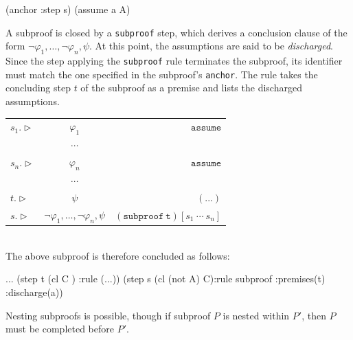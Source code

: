 \begin{code}[style=lbnf,escapechar=@]
	(anchor :step s)
	(assume a A)
\end{code}


A subproof is closed by a \texttt{subproof} step, which derives a conclusion clause of the form $\lnot\varphi_1,\ldots,\lnot\varphi_n,\psi$. At this point, the assumptions are said to be \emph{discharged}. Since the step applying the \texttt{subproof} rule terminates the subproof, its identifier must match the one specified in the subproof's \texttt{anchor}. The rule takes the concluding step $t$ of the subproof as a premise and lists the discharged assumptions.

\noindent\begin{tabularx}{\linewidth}{ l C r }
	$s_1.\triangleright$ &
	$\varphi_1$ &
	${\mathtt{assume}}$ \\
	
	& $\cdots$ & \\
	
	$s_n.\triangleright$ &
	$\varphi_n$ &
	${\mathtt{assume}}$ \\
	
	& $\cdots$ & \\
	
	$t.\triangleright$ &
	$\psi$ &
	${\mathtt{(...)}}$ \\


	$s.\triangleright$ & 
	$\lnot\varphi_1,\dots,\lnot\varphi_n,\psi$ & 
	${\mathtt{(subproof \: t)}[s_1 \: \cdots \: s_n]}$
\end{tabularx} \\

The above subproof is therefore concluded as follows:

\begin{code}[style=lbnf,escapechar=@]
	...
	(step t (cl C ) :rule (...))
	(step s (cl (not A) C):rule subproof :premises(t) 
                                      :discharge(a))
\end{code}

Nesting subproofs is possible, though if subproof $P$ is nested within $P'$, then $P$ must be completed before $P'$. 


